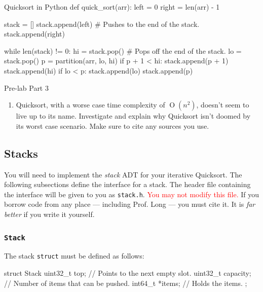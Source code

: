 \documentclass[11pt]{article}
\begin{document}
\begin{pythonlisting}{Quicksort in Python}
def quick_sort(arr):
    left = 0
    right = len(arr) - 1

    stack = []
    stack.append(left) # Pushes to the end of the stack.
    stack.append(right)

    while len(stack) != 0:
        hi = stack.pop() # Pops off the end of the stack.
        lo = stack.pop()
        p = partition(arr, lo, hi)
        if p + 1 < hi:
            stack.append(p + 1)
            stack.append(hi)
        if lo < p:
            stack.append(lo)
            stack.append(p)
\end{pythonlisting}

\medskip
\begin{prelab}{Pre-lab Part 3}
  \begin{enumerate}
    \item Quicksort, with a worse case time complexity of
      $\operatorname{O}(n^2)$, doesn't seem to live up to its name.
      Investigate and explain why Quicksort isn't doomed by its worst
      case scenario. Make sure to cite any sources you use.
  \end{enumerate}
\end{prelab}

\subsection{Stacks}

You will need to implement the \emph{stack} ADT for your iterative
Quicksort. The following subsections define the interface for a stack.
The header file containing the interface will be given to you as
\texttt{stack.h}. \textcolor{red}{You may not modify this file.} If you
borrow code from any place --- including Prof. Long --- you must cite
it. It is \emph{far better} if you write it yourself.

\subsubsection{\texttt{Stack}}

The stack \texttt{struct} must be defined as follows:

\begin{codelisting}{}
struct Stack {
  uint32_t top;       // Points to the next empty slot.
  uint32_t capacity;  // Number of items that can be pushed.
  int64_t *items;     // Holds the items.
};
\end{codelisting}
\end{document}
